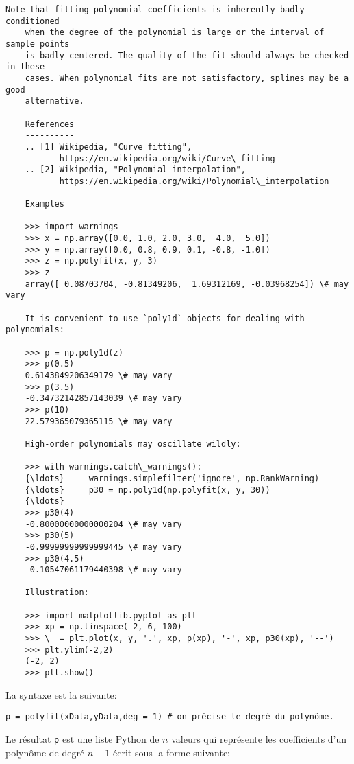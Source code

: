 \documentclass[11pt]{article}
\begin{document}
\begin{Verbatim}[commandchars=\\\{\}]
    Note that fitting polynomial coefficients is inherently badly conditioned
    when the degree of the polynomial is large or the interval of sample points
    is badly centered. The quality of the fit should always be checked in these
    cases. When polynomial fits are not satisfactory, splines may be a good
    alternative.

    References
    ----------
    .. [1] Wikipedia, "Curve fitting",
           https://en.wikipedia.org/wiki/Curve\_fitting
    .. [2] Wikipedia, "Polynomial interpolation",
           https://en.wikipedia.org/wiki/Polynomial\_interpolation

    Examples
    --------
    >>> import warnings
    >>> x = np.array([0.0, 1.0, 2.0, 3.0,  4.0,  5.0])
    >>> y = np.array([0.0, 0.8, 0.9, 0.1, -0.8, -1.0])
    >>> z = np.polyfit(x, y, 3)
    >>> z
    array([ 0.08703704, -0.81349206,  1.69312169, -0.03968254]) \# may vary

    It is convenient to use `poly1d` objects for dealing with polynomials:

    >>> p = np.poly1d(z)
    >>> p(0.5)
    0.6143849206349179 \# may vary
    >>> p(3.5)
    -0.34732142857143039 \# may vary
    >>> p(10)
    22.579365079365115 \# may vary

    High-order polynomials may oscillate wildly:

    >>> with warnings.catch\_warnings():
    {\ldots}     warnings.simplefilter('ignore', np.RankWarning)
    {\ldots}     p30 = np.poly1d(np.polyfit(x, y, 30))
    {\ldots}
    >>> p30(4)
    -0.80000000000000204 \# may vary
    >>> p30(5)
    -0.99999999999999445 \# may vary
    >>> p30(4.5)
    -0.10547061179440398 \# may vary

    Illustration:

    >>> import matplotlib.pyplot as plt
    >>> xp = np.linspace(-2, 6, 100)
    >>> \_ = plt.plot(x, y, '.', xp, p(xp), '-', xp, p30(xp), '--')
    >>> plt.ylim(-2,2)
    (-2, 2)
    >>> plt.show()

    \end{Verbatim}

    La syntaxe est la suivante:

\begin{verbatim}
p = polyfit(xData,yData,deg = 1) # on précise le degré du polynôme.
\end{verbatim}

Le résultat \texttt{p} est une liste Python de \(n\) valeurs qui
représente les coefficients d'un polynôme de degré \(n-1\) écrit sous la
forme suivante:
\end{document}
